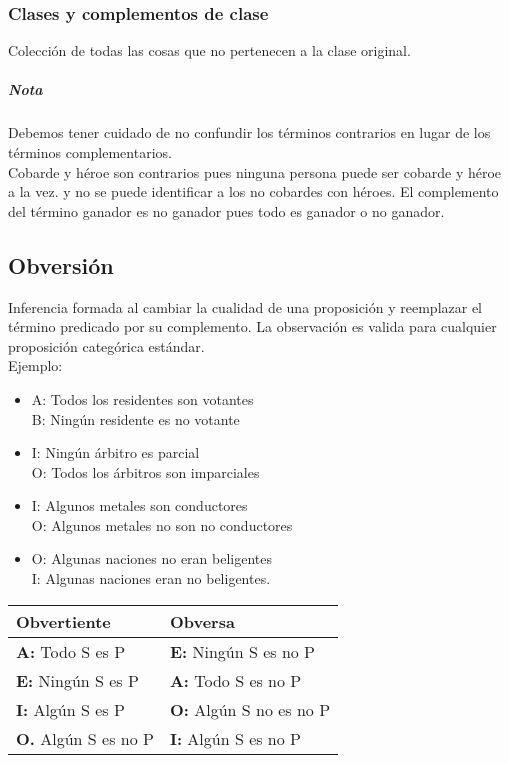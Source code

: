\documentclass[10pt]{book} 						%
\begin{document}
\subsubsection{Clases y complementos de clase}
Colección de todas las cosas que no pertenecen a la clase original.
\subparagraph{Nota}
Debemos tener cuidado de no confundir los términos contrarios en lugar de los términos complementarios.\\
Cobarde y héroe son contrarios pues ninguna persona puede ser cobarde y héroe a la vez. y no se puede identificar a los no cobardes con héroes.
El complemento del término ganador es no ganador pues todo es ganador o no ganador.  
\subsection{Obversión}
Inferencia formada al cambiar la cualidad de una proposición y reemplazar el término predicado por su complemento. La observación es valida para cualquier proposición categórica estándar.\\
Ejemplo:\\
\begin{itemize}
\item 
A: Todos los residentes son votantes\\
B: Ningún residente es no votante\\
\item I: Ningún árbitro es parcial\\
O: Todos los árbitros son imparciales\\
\item I: Algunos metales son conductores\\
O: Algunos metales no son no conductores\\
\item O: Algunas naciones no eran beligentes\\
I: Algunas naciones eran no beligentes.
\end{itemize}

\begin{center}
\begin{tabular}{l l}
Obvertiente & Obversa \\
\hline
\textbf{A:} Todo S es P & \textbf{E:} Ningún S es no P\\
\textbf{E:} Ningún S es P & \textbf{A:} Todo S es no P\\
\textbf{I:} Algún S es P & \textbf{O:} Algún S no es no P\\
\textbf{O.} Algún S es no P & \textbf{I:} Algún S es no P\\
\end{tabular}
\end{center}
\end{document}
